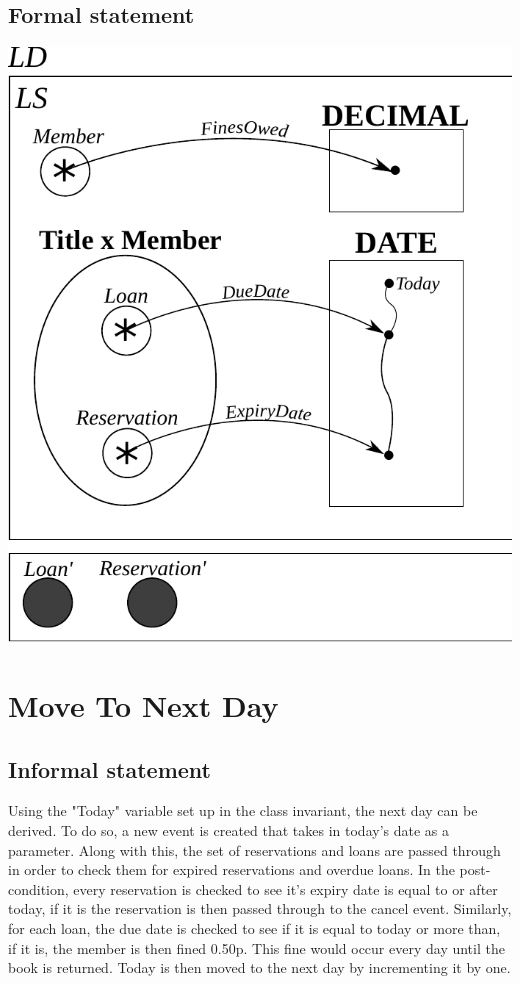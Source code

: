 \documentclass[]{report}
\begin{document}
\subsection{Formal statement}
\begin{center}
\includegraphics{class_invariant.pdf}
\end{center}
\newpage
\section{Move To Next Day}
\subsection{Informal statement}
Using the "Today" variable set up in the class invariant, the next day can be derived. To do so, a new event is created that takes in today's date as a parameter. Along with this, the set of reservations and loans are passed through in order to check them for expired reservations and overdue loans. In the post-condition, every reservation is checked to see it's expiry date is equal to or after today, if it is the reservation is then passed through to the cancel event. Similarly, for each loan, the due date is checked to see if it is equal to today or more than, if it is, the member is then fined 0.50p. This fine would occur every day until the book is returned. Today is then moved to the next day by incrementing it by one.
\end{document}
